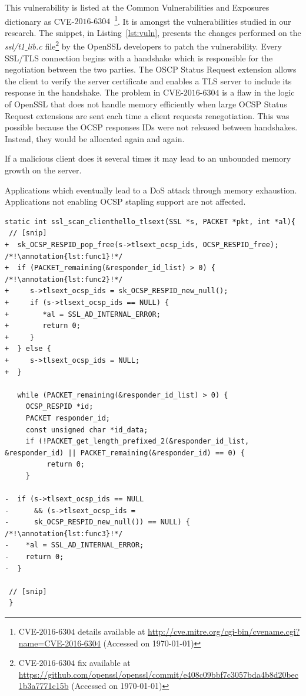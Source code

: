 \documentclass[10pt,conference]{IEEEtran}
\newcounter{lstannotation}
\renewcommand{\thelstannotation}{\ding{\number\numexpr181+\arabic{lstannotation}}}
\newcommand{\annotation}[1]{\refstepcounter{lstannotation}\label{#1}\thelstannotation}
\begin{document}
This vulnerability is listed at the Common
Vulnerabilities and Exposures dictionary as CVE-$2016$-$6304$~\footnote{CVE-$2016$-$6304$
details available at \url{http://cve.mitre.org/cgi-bin/cvename.cgi?name=CVE-2016-6304}
(Accessed on \today{})}. It is amongst the vulnerabilities studied in our
research. The snippet, in Listing~\ref{lst:vuln}, presents the changes performed on the
\emph{ssl/t1$\_$lib.c} file\footnote{CVE-$2016$-$6304$ fix available  at
\url{https://github.com/openssl/openssl/commit/e408c09bbf7c3057bda4b8d20bec1b3a7771c15b}
(Accessed on \today{})} by the OpenSSL developers to patch the vulnerability. 
Every SSL/TLS connection begins with a handshake 
which is responsible for the negotiation between the two parties. 
The OSCP Status Request extension allows the client to verify
the server certificate and enables a TLS server to include
its response in the handshake. The problem in CVE-$2016$-$6304$
is a flaw in the logic of OpenSSL that does not handle memory efficiently
when large OCSP Status Request extensions are sent each time a client 
requests renegotiation. This was possible because the OCSP responses IDs 
were not released between handshakes. Instead, they would be allocated 
again and again. 



If 
a malicious client does it several times it may lead to an unbounded memory
growth on the server. 




Applications 
which eventually lead to a DoS attack through memory exhaustion. 
Applications not enabling OCSP stapling support are not affected.

\medskip
\setcounter{lstannotation}{0}
\begin{lstlisting}[style={CStyle}, caption={Patch provided by OpenSSL developers to the
\\CVE-2016-6304 vulnerability on file ssl/t1\_lib.c},label={lst:vuln}]
static int ssl_scan_clienthello_tlsext(SSL *s, PACKET *pkt, int *al){ 
 // [snip]
+  sk_OCSP_RESPID_pop_free(s->tlsext_ocsp_ids, OCSP_RESPID_free); /*!\annotation{lst:func1}!*/
+  if (PACKET_remaining(&responder_id_list) > 0) { /*!\annotation{lst:func2}!*/
+     s->tlsext_ocsp_ids = sk_OCSP_RESPID_new_null();
+     if (s->tlsext_ocsp_ids == NULL) {
+        *al = SSL_AD_INTERNAL_ERROR;
+        return 0;
+     }
+  } else {
+     s->tlsext_ocsp_ids = NULL;
+  }

   while (PACKET_remaining(&responder_id_list) > 0) {
     OCSP_RESPID *id;
     PACKET responder_id;
     const unsigned char *id_data;
     if (!PACKET_get_length_prefixed_2(&responder_id_list, &responder_id) || PACKET_remaining(&responder_id) == 0) {
          return 0;
     }

-  if (s->tlsext_ocsp_ids == NULL 
-      && (s->tlsext_ocsp_ids = 
-      sk_OCSP_RESPID_new_null()) == NULL) { /*!\annotation{lst:func3}!*/
-    *al = SSL_AD_INTERNAL_ERROR;
-    return 0;
-  }

 // [snip]
 }
\end{lstlisting}
\end{document}
